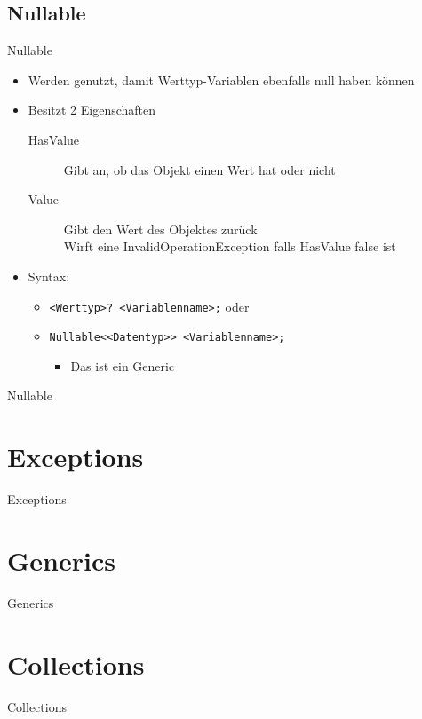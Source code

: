 \subsection{Nullable}
\begin{frame}{Nullable}
	\begin{itemize}
		\item Werden genutzt, damit Werttyp-Variablen ebenfalls \alert{null} haben können
		\item Besitzt 2 Eigenschaften
		\begin{description}
			\item[HasValue] Gibt an, ob das Objekt einen Wert hat oder nicht
			\item[Value] Gibt den Wert des Objektes zurück\\ Wirft eine InvalidOperationException falls HasValue false ist 
		\end{description}
		\item Syntax:
		\begin{itemize}
			\item \texttt{\alert{<Werttyp>}? \alert{<Variablenname>};} oder
			\item \texttt{Nullable<\alert{<Datentyp>}> \alert{<Variablenname>};}
			\begin{itemize}
				\item Das ist ein Generic
			\end{itemize}
		\end{itemize}
	\end{itemize}
\end{frame}

\begin{frame}{Nullable}
		
\end{frame}

\section{Exceptions}
\begin{frame}{Exceptions}

\end{frame}

\section{Generics}
\begin{frame}{Generics}

\end{frame}

\section{Collections}
\begin{frame}{Collections}

\end{frame}


